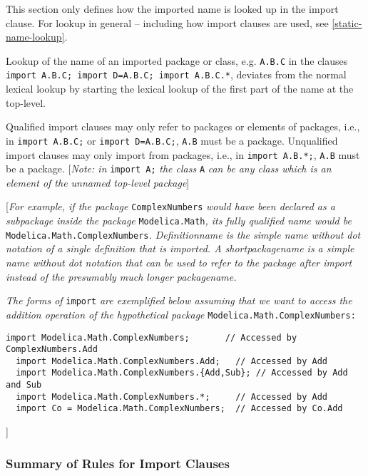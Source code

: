This section only defines how the imported name is looked up in the
import clause. For lookup in general -- including how import clauses are
used, see \autoref{static-name-lookup}.

Lookup of the name of an imported package or class, e.g. \lstinline!A.B.C! in the
clauses \lstinline!import A.B.C; import D=A.B.C; import A.B.C.*!, deviates from the
normal lexical lookup by starting the lexical lookup of the first part
of the name at the top-level.

Qualified import clauses may only refer to packages or elements of
packages, i.e., in \lstinline!import A.B.C;! or \lstinline!import D=A.B.C;!, 
\lstinline!A.B! must be a
package. Unqualified import clauses may only import from packages, i.e.,
in \lstinline!import A.B.*;!, \lstinline!A.B! must be a package. {[}\emph{Note: in} \lstinline!import A;!
\emph{the class} \lstinline!A! \emph{can be any class which is an element of the
unnamed top-level package}{]}

{[}\emph{For example, if the package} \lstinline!ComplexNumbers! \emph{would have
been declared as a subpackage inside the package} \lstinline!Modelica.Math!\emph{,
its fully qualified name would be} \lstinline!Modelica.Math.ComplexNumbers!\emph{.
Definitionname is the simple name without dot notation of a single
definition that is imported. A shortpackagename is a simple name without
dot notation that can be used to refer to the package after import
instead of the presumably much longer packagename.}


\emph{The forms of} \lstinline!import! \emph{are exemplified below assuming that we want to
access the addition operation of the hypothetical package}
\lstinline!Modelica.Math.ComplexNumbers:!

\begin{lstlisting}[language=modelica]
  import Modelica.Math.ComplexNumbers;       // Accessed by ComplexNumbers.Add
  import Modelica.Math.ComplexNumbers.Add;   // Accessed by Add
  import Modelica.Math.ComplexNumbers.{Add,Sub}; // Accessed by Add and Sub
  import Modelica.Math.ComplexNumbers.*;     // Accessed by Add
  import Co = Modelica.Math.ComplexNumbers;  // Accessed by Co.Add
\end{lstlisting}
{]}

\subsubsection{Summary of Rules for Import Clauses}

